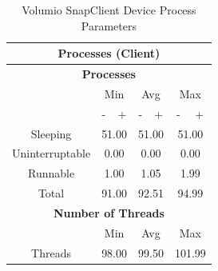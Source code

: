 \documentclass[11pt,a4paper]{scrreprt}
\begin{document}
\begin{table}[H]
\centering
    \begin{tabular}{||c|c|c|c|c|c|c||}
    \hline
    \multicolumn{7}{|c|}{\textbf{Processes (Client)}} \\
    \hline
    \multicolumn{7}{|c|}{\textbf{Processes}} \\
    \hline\hline
      & \multicolumn{2}{|c|}{Min} & \multicolumn{2}{|c|}{Avg} & \multicolumn{2}{|c|}{Max} \\
    \hline
      & - & + & - & + & - & + \\
    \hline
    Sleeping & \multicolumn{2}{|c|}{51.00} & \multicolumn{2}{|c|}{51.00} & \multicolumn{2}{|c|}{51.00} \\
    \hline
    Uninterruptable & \multicolumn{2}{|c|}{0.00} & \multicolumn{2}{|c|}{0.00} & \multicolumn{2}{|c|}{0.00} \\
    \hline
    Runnable & \multicolumn{2}{|c|}{1.00} & \multicolumn{2}{|c|}{1.05} & \multicolumn{2}{|c|}{1.99} \\
    \hline
    Total & \multicolumn{2}{|c|}{91.00} & \multicolumn{2}{|c|}{92.51} & \multicolumn{2}{|c|}{94.99} \\
    \hline\hline
    \multicolumn{7}{|c|}{\textbf{Number of Threads}} \\
    \hline\hline
      & \multicolumn{2}{|c|}{Min} & \multicolumn{2}{|c|}{Avg} & \multicolumn{2}{|c|}{Max} \\
    \hline
    Threads  & \multicolumn{2}{|c|}{98.00} & \multicolumn{2}{|c|}{99.50} & \multicolumn{2}{|c|}{101.99} \\
    \hline\hline
    \end{tabular}
    \caption{Volumio SnapClient Device Process Parameters}
    \label{VolumioclientProcessTab}
\end{table}
\end{document}

